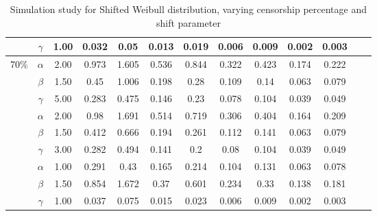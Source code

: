 \documentclass[10pt,a4paper,onecolumn]{article} %
\begin{document}
\begin{table}[H]
\begin{tabular}{ccccccccccccc}
   & $\gamma$ & 1.00 & 0.032 & 0.05 & 0.013 & 0.019 & 0.006 & 0.009 & 0.002 & 0.003 \\ 
 \hline
70\% & $\alpha$ & 2.00 & 0.973 & 1.605 & 0.536 & 0.844 & 0.322 & 0.423 & 0.174 & 0.222 \\ 
   & $\beta$ & 1.50 & 0.45 & 1.006 & 0.198 & 0.28 & 0.109 & 0.14 & 0.063 & 0.079 \\ 
   & $\gamma$ & 5.00 & 0.283 & 0.475 & 0.146 & 0.23 & 0.078 & 0.104 & 0.039 & 0.049 \\ \cmidrule{2-11}
   & $\alpha$ & 2.00 & 0.98 & 1.691 & 0.514 & 0.719 & 0.306 & 0.404 & 0.164 & 0.209 \\ 
   & $\beta$ & 1.50 & 0.412 & 0.666 & 0.194 & 0.261 & 0.112 & 0.141 & 0.063 & 0.079 \\ 
   & $\gamma$ & 3.00 & 0.282 & 0.494 & 0.141 & 0.2 & 0.08 & 0.104 & 0.039 & 0.049 \\ \cmidrule{2-11}
   & $\alpha$ & 1.00 & 0.291 & 0.43 & 0.165 & 0.214 & 0.104 & 0.131 & 0.063 & 0.078 \\ 
   & $\beta$ & 1.50 & 0.854 & 1.672 & 0.37 & 0.601 & 0.234 & 0.33 & 0.138 & 0.181 \\ 
   & $\gamma$ & 1.00 & 0.037 & 0.075 & 0.015 & 0.023 & 0.006 & 0.009 & 0.002 & 0.003 \\ 
   \hline
\end{tabular}
\caption{Simulation study for Shifted Weibull distribution, varying censorship percentage and shift parameter}\label{Simulation_Weibull}
\end{table}
\end{document}
